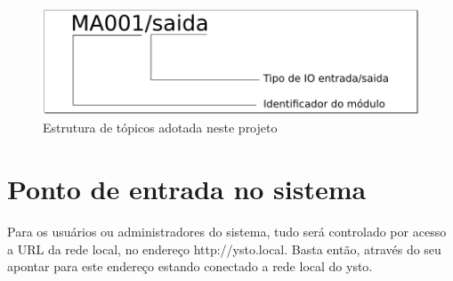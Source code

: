 \begin{figure}[H]
\caption{\label{mqtt-6} Estrutura de tópicos adotada neste projeto}
\includegraphics[scale=0.25]{img/topicos.png}
\end{figure}

\section{Ponto de entrada no sistema}
Para os usuários ou administradores do sistema, tudo será controlado por acesso a URL da rede local, no endereço http://ysto.local. Basta então, através do seu apontar para este endereço estando conectado a rede local do ysto.






